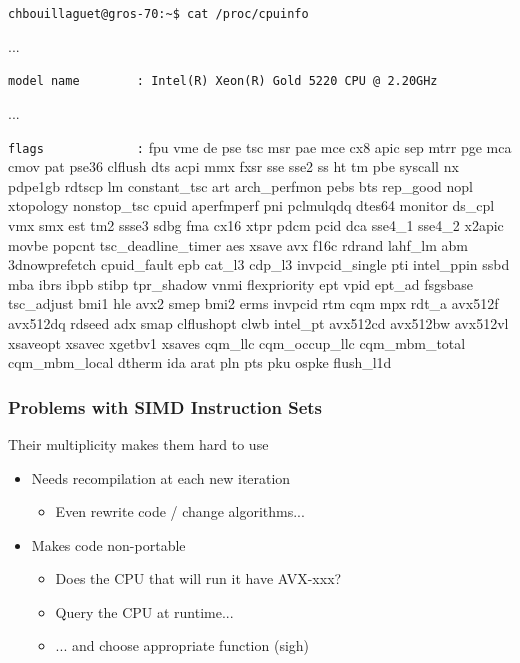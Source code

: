 \documentclass[xcolor={x11names,svgnames}]{beamer}
\begin{document}
\begin{frame}[fragile]

\verb|chbouillaguet@gros-70:~$ cat /proc/cpuinfo|

\ttfamily\scriptsize
...

\verb|model name        : Intel(R) Xeon(R) Gold 5220 CPU @ 2.20GHz|


...

\verb|flags             :| fpu vme de pse tsc msr pae mce cx8 apic sep mtrr pge mca cmov pat pse36 clflush dts acpi \alert{mmx} fxsr \alert{sse sse2} ss ht tm pbe syscall nx pdpe1gb rdtscp lm constant\_tsc art arch\_perfmon pebs bts rep\_good nopl xtopology nonstop\_tsc cpuid aperfmperf pni pclmulqdq dtes64 monitor ds\_cpl vmx smx est tm2 \alert{ssse3} sdbg fma cx16 xtpr pdcm pcid dca \alert{sse4\_1 sse4\_2} x2apic movbe popcnt tsc\_deadline\_timer aes xsave \alert{avx} f16c rdrand lahf\_lm abm 3dnowprefetch cpuid\_fault epb cat\_l3 cdp\_l3 invpcid\_single pti intel\_ppin ssbd mba ibrs ibpb stibp tpr\_shadow vnmi flexpriority ept vpid ept\_ad fsgsbase tsc\_adjust bmi1 hle \alert{avx2} smep bmi2 erms invpcid rtm cqm mpx rdt\_a \alert{avx512f avx512dq} rdseed adx smap clflushopt clwb intel\_pt \alert{avx512cd avx512bw avx512vl} xsaveopt xsavec xgetbv1 xsaves cqm\_llc cqm\_occup\_llc cqm\_mbm\_total cqm\_mbm\_local dtherm ida arat pln pts pku ospke flush\_l1d
\end{frame}


\begin{frame}
  \frametitle{Problems with SIMD Instruction Sets}

  Their multiplicity makes them hard to use

  \bigskip
  
  \begin{itemize}
  \item Needs recompilation at each new iteration
    \begin{itemize}
    \item Even rewrite code / change algorithms... 
    \end{itemize}

    \medskip
    
  \item Makes code non-portable
    \begin{itemize}
    \item Does the CPU that will run it have AVX-xxx?
    \item Query the CPU \alert{at runtime}...
    \item ... and choose appropriate function (sigh)
    \end{itemize}
    
  \end{itemize}
\end{frame}
\end{document}
